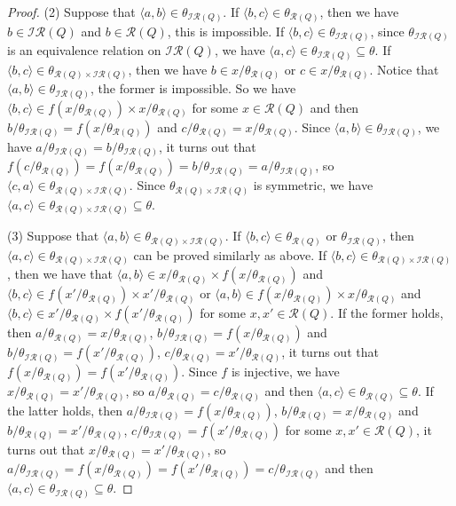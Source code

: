 \documentclass[12pt]{amsart}
\theoremstyle{definition}
\theoremstyle{remark}
\numberwithin{equation}{section}
\begin{document}
\begin{proof}
(2) Suppose that $\langle a,b \rangle\in \theta_{\mathscr{IR}(Q)}$.  If $\langle b,c \rangle\in \theta_{\mathscr{R}(Q)}$, then we have $b\in \mathscr{IR}(Q)$ and $b\in \mathscr{R}(Q)$, this is impossible.  If $\langle b,c \rangle\in \theta_{\mathscr{IR}(Q)}$, since $\theta_{\mathscr{IR}(Q)}$ is an equivalence relation on $\mathscr{IR}(Q)$, we have $\langle a,c \rangle\in \theta_{\mathscr{IR}(Q)}\subseteq\theta$.  If $\langle b,c \rangle\in \theta_{\mathscr{R}(Q)\times \mathscr{IR}(Q)}$, then we have $b\in x/\theta_{\mathscr{R}(Q)}$ or $c\in x/\theta_{\mathscr{R}(Q)}$. Notice that $\langle a,b\rangle\in \theta_{\mathscr{IR}(Q)}$, the former is impossible.
So we have $\langle b,c \rangle\in f(x/\theta_{\mathscr{R}(Q)})\times x/\theta_{\mathscr{R}(Q)}$ for some $x\in \mathscr{R}(Q)$ and then $b/\theta_{\mathscr{IR}(Q)}=f(x/\theta_{\mathscr{R}(Q)})$ and $c/\theta_{\mathscr{R}(Q)}=x/\theta_{\mathscr{R}(Q)}$.
Since $\langle a,b \rangle\in \theta_{\mathscr{IR}(Q)}$, we have $a/\theta_{\mathscr{IR}(Q)}=b/\theta_{\mathscr{IR}(Q)}$, it turns out that $f(c/\theta_{\mathscr{R}(Q)})=f(x/\theta_{\mathscr{R}(Q)})=b/\theta_{\mathscr{IR}(Q)}=a/\theta_{\mathscr{IR}(Q)}$, so $\langle c,a\rangle\in \theta_{\mathscr{R}(Q)\times \mathscr{IR}(Q)}$. Since $\theta_{\mathscr{R}(Q)\times \mathscr{IR}(Q)}$ is symmetric, we have $\langle a,c\rangle\in \theta_{\mathscr{R}(Q)\times \mathscr{IR}(Q)}\subseteq\theta$.


(3) Suppose that  $\langle a,b \rangle\in\theta_{\mathscr{R}(Q)\times \mathscr{IR}(Q)}$.
If $\langle b,c \rangle\in \theta_{\mathscr{R}(Q)}$ or $\theta_{\mathscr{IR}(Q)}$, then $\langle a,c \rangle\in\theta_{\mathscr{R}(Q)\times \mathscr{IR}(Q)}$ can be proved similarly as above.
If $\langle b,c \rangle\in\theta_{\mathscr{R}(Q)\times \mathscr{IR}(Q)}$, then we have that $\langle a,b\rangle\in x/\theta_{\mathscr{R}(Q)}\times f(x/\theta_{\mathscr{R}(Q)})$
and $\langle b,c\rangle\in f(x'/\theta_{\mathscr{R}(Q)})\times x'/\theta_{\mathscr{R}(Q)}$ or $\langle a,b\rangle\in f(x/\theta_{\mathscr{R}(Q)})\times x/\theta_{\mathscr{R}(Q)}$
and $\langle b,c\rangle\in x'/\theta_{\mathscr{R}(Q)}\times f(x'/\theta_{\mathscr{R}(Q)})$ for some $x,x'\in \mathscr{R}(Q)$. If the former holds, then $a/\theta_{\mathscr{R}(Q)}=x/\theta_{\mathscr{R}(Q)}$, $b/\theta_{\mathscr{IR}(Q)}=f(x/\theta_{\mathscr{R}(Q)})$ and $b/\theta_{\mathscr{IR}(Q)}=f(x'/\theta_{\mathscr{R}(Q)})$,
$c/\theta_{\mathscr{R}(Q)}=x'/\theta_{\mathscr{R}(Q)}$, it turns out that $f(x/\theta_{\mathscr{R}(Q)})=f(x'/\theta_{\mathscr{R}(Q)})$. Since $f$ is injective, we have $x/\theta_{\mathscr{R}(Q)}=x'/\theta_{\mathscr{R}(Q)}$, so $a/\theta_{\mathscr{R}(Q)}=c/\theta_{\mathscr{R}(Q)}$ and then $\langle a,c\rangle\in \theta_{\mathscr{R}(Q)}\subseteq\theta$. If the latter holds, then $a/\theta_{\mathscr{IR}(Q)}=f(x/\theta_{\mathscr{R}(Q)})$, $b/\theta_{\mathscr{R}(Q)}=x/\theta_{\mathscr{R}(Q)}$ and $b/\theta_{\mathscr{R}(Q)}=x'/\theta_{\mathscr{R}(Q)}$,
$c/\theta_{\mathscr{IR}(Q)}=f(x'/\theta_{\mathscr{R}(Q)})$ for some $x, x' \in \mathscr{R}(Q)$, it turns out that $x/\theta_{\mathscr{R}(Q)}=x'/\theta_{\mathscr{R}(Q)}$, so $a/\theta_{\mathscr{IR}(Q)}=f(x/\theta_{\mathscr{R}(Q)})=f(x'/\theta_{\mathscr{R}(Q)})=c/\theta_{\mathscr{IR}(Q)}$ and then
$\langle a,c\rangle\in \theta_{\mathscr{IR}(Q)}\subseteq \theta$.


\end{proof}
\end{document}
